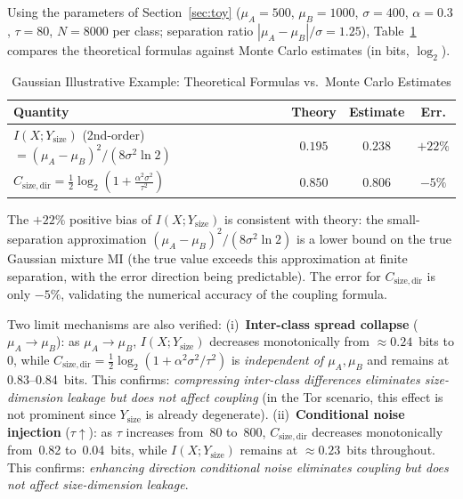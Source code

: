 \documentclass[lettersize,journal]{IEEEtran}
\begin{document}
Using the parameters of Section~\ref{sec:toy}
($\mu_A=500$, $\mu_B=1000$, $\sigma=400$, $\alpha=0.3$, $\tau=80$,
$N=8000$ per class; separation ratio $|\mu_A-\mu_B|/\sigma=1.25$),
Table~\ref{tab:toy} compares the theoretical formulas against Monte Carlo
estimates (in bits, $\log_2$).

\begin{table}[!t]
\centering\small
\caption{Gaussian Illustrative Example: Theoretical Formulas vs.\ Monte Carlo Estimates}
\label{tab:toy}
\begin{tabular}{p{4.2cm}ccc}
\toprule
Quantity & Theory & Estimate & Err. \\
\midrule
$I(X;Y_{\mathrm{size}})$ (2nd-order)\newline
$=(\mu_A\!-\!\mu_B)^2/(8\sigma^2\ln 2)$
  & $0.195$ & $0.238$ & $+22\%$ \\[2pt]
$C_{\mathrm{size,dir}} = \tfrac{1}{2}\log_2\!\left(1\!+\!\tfrac{\alpha^2\sigma^2}{\tau^2}\right)$
  & $0.850$ & $0.806$ & $-5\%$ \\
\bottomrule
\end{tabular}
\end{table}

The $+22\%$ positive bias of $I(X;Y_{\mathrm{size}})$ is consistent with
theory: the small-separation approximation
$(\mu_A-\mu_B)^2/(8\sigma^2\ln 2)$ is a lower bound on the true Gaussian
mixture MI (the true value exceeds this approximation at finite
separation, with the error direction being predictable).
The error for $C_{\mathrm{size,dir}}$ is only $-5\%$, validating the
numerical accuracy of the coupling formula.

Two limit mechanisms are also verified:
(i)~\textbf{Inter-class spread collapse} ($\mu_A\to\mu_B$): as
$\mu_A\to\mu_B$, $I(X;Y_{\mathrm{size}})$ decreases monotonically from
$\approx 0.24$~bits to 0, while
$C_{\mathrm{size,dir}}=\frac{1}{2}\log_2(1+\alpha^2\sigma^2/\tau^2)$
is \emph{independent of $\mu_A, \mu_B$} and remains at 0.83--0.84~bits.
This confirms: \emph{compressing inter-class differences eliminates size-dimension
leakage but does not affect coupling} (in the Tor scenario, this effect is
not prominent since $Y_{\mathrm{size}}$ is already degenerate).
(ii)~\textbf{Conditional noise injection} ($\tau\uparrow$): as $\tau$
increases from~80 to~800, $C_{\mathrm{size,dir}}$ decreases monotonically
from~0.82 to~0.04~bits, while $I(X;Y_{\mathrm{size}})$ remains at
$\approx 0.23$~bits throughout.
This confirms: \emph{enhancing direction conditional noise eliminates coupling
but does not affect size-dimension leakage}.
\end{document}
